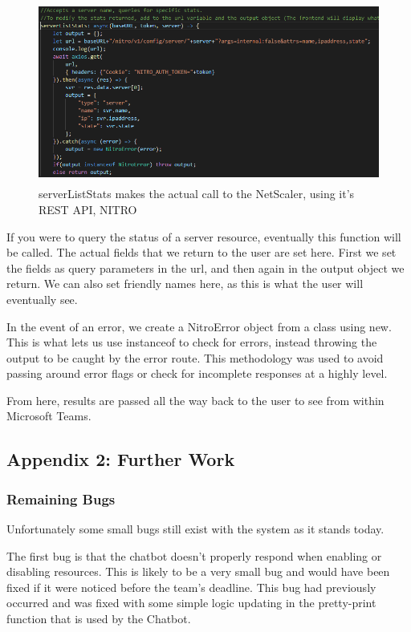 \documentclass[onecolumn, draftclsnofoot,10pt, compsoc]{IEEEtran}
\begin{document}
    \begin{figure}[ht]
        \centering
        \includegraphics[height=6cm]{code11.png}
        \caption[Nitro Library Function]{serverListStats makes the actual call to the NetScaler, using it's REST API, NITRO}
        \label{fig:Nitro Library Function}
    \end{figure}
    
    If you were to query the status of a server resource, eventually this function will be called.
    The actual fields that we return to the user are set here.
    First we set the fields as query parameters in the url, and then again in the output object we return.
    We can also set friendly names here, as this is what the user will eventually see.
    
    In the event of an error, we create a NitroError object from a class using new.
    This is what lets us use instanceof to check for errors, instead throwing the output to be caught by the error route.
    This methodology was used to avoid passing around error flags or check for incomplete responses at a highly level.
    
    From here, results are passed all the way back to the user to see from within Microsoft Teams.

\subsection{Appendix 2: Further Work}
\subsubsection{Remaining Bugs}
    Unfortunately some small bugs still exist with the system as it stands today.
    
    The first bug is that the chatbot doesn't properly respond when enabling or disabling resources.
    This is likely to be a very small bug and would have been fixed if it were noticed before the team's deadline.
    This bug had previously occurred and was fixed with some simple logic updating in the pretty-print function that is used by the Chatbot.
    
\end{document}
